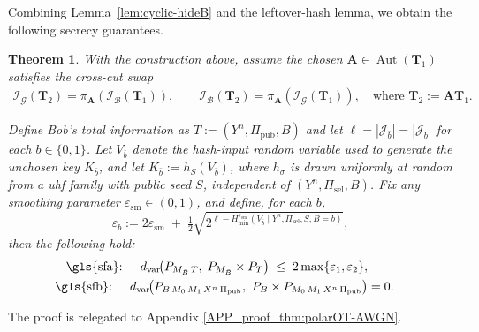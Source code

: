 \documentclass[onecolumn]{IEEEtran} %
\newcommand{\bA}{\mathbf A}
\newcommand{\1}{\mathbbm{1}}
\DeclareMathOperator{\Aut}{Aut}
\theoremstyle{boldremark}
\newtheorem{thm}{Theorem}
\newcommand{\bT}{\mathbf{T}}
\begin{document}
Combining Lemma~\ref{lem:cyclic-hideB} and the leftover-hash lemma, we obtain the following secrecy guarantees.

\begin{thm}\label{thm:polarOT-AWGN}
With the construction above, assume the chosen $\bA\in\Aut(\bT_1)$ satisfies the cross-cut swap
\begin{align}
    \mathcal{I}_{\mathcal G}(\bT_2)=\pi_{\bA}(\mathcal{I}_{\mathcal B}(\bT_1)),\qquad
    \mathcal{I}_{\mathcal B}(\bT_2)=\pi_{\bA}(\mathcal{I}_{\mathcal G}(\bT_1)),
    \quad\text{where }\bT_2:=\bA\bT_1.    \label{EQ_cross_cut_swap}
\end{align}

Define Bob's total information as
\(
T := (Y^n,\Pi_{\mathrm{pub}},B)
\)
and let \(\ell = |\mathcal J_{\bar b}|=|\mathcal J_{b}|\) for each \(b\in\{0,1\}\).
Let \(V_{\bar b}\) denote the hash-input random variable used to generate the
unchosen key \(K_{\bar b}\), and let
\(K_{\bar b} := h_{S}(V_{\bar b})\), where \(h_{\sigma}\) is drawn uniformly at random
from a \gls{uhf} family with public seed \(S\), independent of \((Y^n,\Pi_{\mathrm{sel}},B)\).
Fix any smoothing parameter \(\varepsilon_{\mathrm{sm}}\in(0,1)\), and define, for each \(b\),
\begin{equation}\label{eq:eps-def-new}
  \varepsilon_b
  :=
  2\varepsilon_{\mathrm{sm}}
  \;+\;
  \tfrac12 \sqrt{2^{\ell - H_{\min}^{\varepsilon_{\mathrm{sm}}}(V_{\bar b}\mid Y^n,\Pi_{\mathrm{sel}},S,B=b)}},
\end{equation}
then the following hold:
\begin{align}
\text{\gls{sfa}: }\quad d_{\mathrm{var}}\!\bigl(P_{M_{\bar B}\,T},\;P_{M_{\bar B}}\times P_{T}\bigr) \;\le\; 2\max\{\varepsilon_1,\varepsilon_2\},\label{eq:SfA_new}
\\
\text{\gls{sfb}: }\quad
d_{\mathrm{var}}\!\big(P_{B\,M_0\,M_1\,X^n\,\Pi_{\mathrm{pub}}},\ P_B\times P_{M_0\,M_1\,X^n\,\Pi_{\mathrm{pub}}}\big)
&=0.
\label{eq:SfB_new}
\end{align}
\end{thm}
The proof is relegated to Appendix \ref{APP_proof_thm:polarOT-AWGN}.
\end{document}
